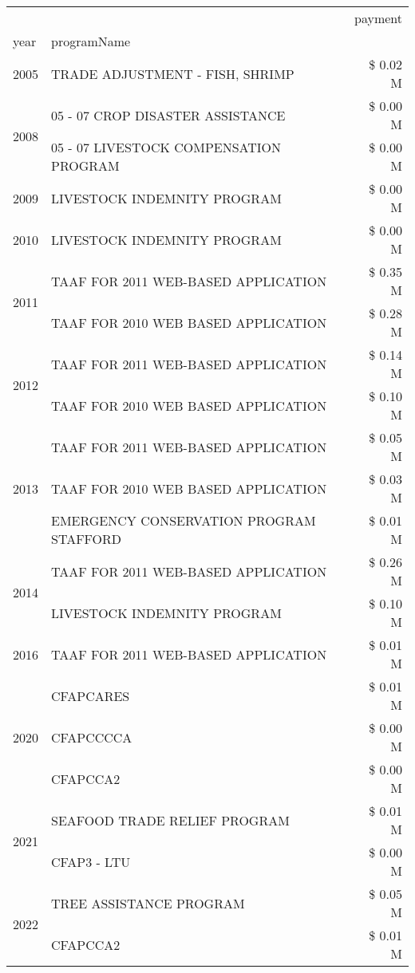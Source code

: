 \begin{tabular}{llr}
\toprule
 &  & payment \\
year & programName &  \\
\midrule
2005 & TRADE ADJUSTMENT - FISH, SHRIMP & \$ 0.02 M \\
\cline{1-3}
\multirow[t]{2}{*}{2008} & 05 - 07 CROP DISASTER ASSISTANCE & \$ 0.00 M \\
 & 05 - 07 LIVESTOCK COMPENSATION PROGRAM & \$ 0.00 M \\
\cline{1-3}
2009 & LIVESTOCK INDEMNITY PROGRAM & \$ 0.00 M \\
\cline{1-3}
2010 & LIVESTOCK INDEMNITY PROGRAM & \$ 0.00 M \\
\cline{1-3}
\multirow[t]{2}{*}{2011} & TAAF FOR 2011 WEB-BASED APPLICATION & \$ 0.35 M \\
 & TAAF FOR 2010 WEB BASED APPLICATION & \$ 0.28 M \\
\cline{1-3}
\multirow[t]{2}{*}{2012} & TAAF FOR 2011 WEB-BASED APPLICATION & \$ 0.14 M \\
 & TAAF FOR 2010 WEB BASED APPLICATION & \$ 0.10 M \\
\cline{1-3}
\multirow[t]{3}{*}{2013} & TAAF FOR 2011 WEB-BASED APPLICATION & \$ 0.05 M \\
 & TAAF FOR 2010 WEB BASED APPLICATION & \$ 0.03 M \\
 & EMERGENCY CONSERVATION PROGRAM STAFFORD & \$ 0.01 M \\
\cline{1-3}
\multirow[t]{2}{*}{2014} & TAAF FOR 2011 WEB-BASED APPLICATION & \$ 0.26 M \\
 & LIVESTOCK INDEMNITY PROGRAM & \$ 0.10 M \\
\cline{1-3}
2016 & TAAF FOR 2011 WEB-BASED APPLICATION & \$ 0.01 M \\
\cline{1-3}
\multirow[t]{3}{*}{2020} & CFAPCARES & \$ 0.01 M \\
 & CFAPCCCCA & \$ 0.00 M \\
 & CFAPCCA2 & \$ 0.00 M \\
\cline{1-3}
\multirow[t]{2}{*}{2021} & SEAFOOD TRADE RELIEF PROGRAM & \$ 0.01 M \\
 & CFAP3 - LTU & \$ 0.00 M \\
\cline{1-3}
\multirow[t]{2}{*}{2022} & TREE ASSISTANCE PROGRAM & \$ 0.05 M \\
 & CFAPCCA2 & \$ 0.01 M \\
\cline{1-3}
\bottomrule
\end{tabular}
